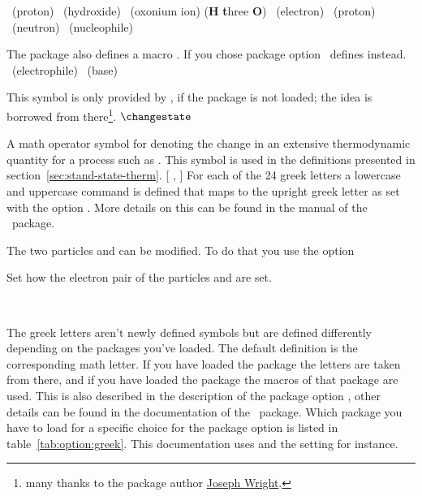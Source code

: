 \documentclass[load-preamble+]{cnltx-doc}
\begin{document}
\begin{commands}
   \Hpl\ (proton)
   \Hyd\ (hydroxide)
   \HtO\ (oxonium ion) (\textbf{H} \textbf{t}hree \textbf{O})
   \water
   \el\ (electron)
   \prt\ (proton)
   \ntr\ (neutron)
   \Nu\ (nucleophile)\par
    The package  also defines a macro .  If you chose
    package option  \chemmacros\ defines 
    instead\label{Nu}.
   \El\ (electrophile)
   \ba\ (base)
   \fplus
   \fminus
   \transitionstatesymbol
   \standardstate\par
    This symbol is only provided by \chemmacros, if the package
     is not loaded; the idea is borrowed from
    there\footnote{many thanks to the package author
      \href{http://www.texdev.net/}{Joseph Wright}.}.
   $\changestate$\par
    A math operator symbol for denoting the change in an extensive
    thermodynamic quantity for a process such as .  This symbol is
    used in the definitions presented in section~\ref{sec:stand-state-therm}.
  [ \chemalpha,  \chemAlpha]
    For each of the 24 greek letters a lowercase and uppercase 
    command is defined that maps to the upright greek letter as set with the
    option .  More details on this can be found in the manual of
    the \chemgreek\ package.
\end{commands}

The two particles  and  can be modified.  To do that you use
the option
\begin{options}
    Set how the electron pair of the particles  and  are set.
\end{options}
\begin{example}
  \ba[elpair] \Nu[elpair=dash]
 
  \ba\ \Nu
\end{example}

\label{desc:greek}The greek letters aren't newly defined symbols but are
defined differently depending on the packages you've loaded.  The default
definition is the corresponding math letter.  If you have loaded the
 package the letters are taken from there, and if you have
loaded the package  the macros of that package are used.  This is
also described in the description of the package option , other
details can be found in the documentation of the \chemgreek\ package.  Which
package you have to load for a specific choice for the package option
 is listed in table~\ref{tab:option:greek}.  This documentation
uses  and the setting  for instance.
\end{document}
